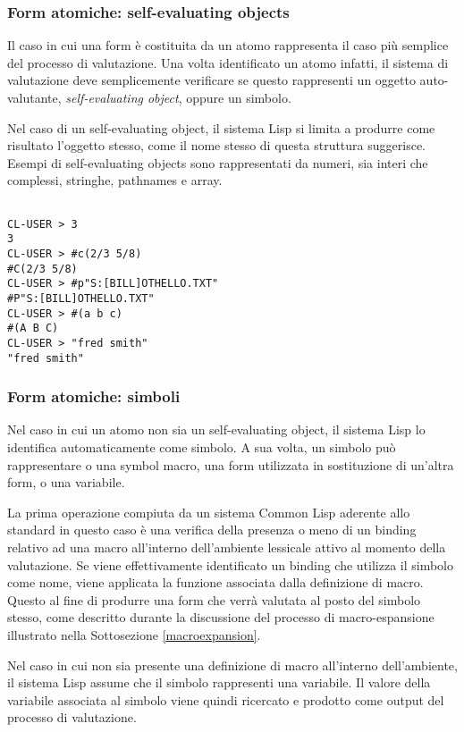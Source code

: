 \subsubsection{Form atomiche: self-evaluating objects}

Il caso in cui una form è costituita da un atomo rappresenta il caso più
semplice del processo di valutazione. Una volta identificato un atomo infatti,
il sistema di valutazione deve semplicemente verificare se questo rappresenti un
oggetto auto-valutante, \textit{self-evaluating object}, oppure un simbolo.

Nel caso di un self-evaluating object, il sistema Lisp si limita a produrre
come risultato l’oggetto stesso, come il nome stesso di questa struttura
suggerisce. Esempi di self-evaluating objects sono rappresentati da numeri,
sia interi che complessi, stringhe, pathnames e array.

\begin{lstlisting}[caption=Esempi di form di tipo self-evaluating object]

CL-USER > 3
3
CL-USER > #c(2/3 5/8)
#C(2/3 5/8)
CL-USER > #p"S:[BILL]OTHELLO.TXT"
#P"S:[BILL]OTHELLO.TXT"
CL-USER > #(a b c)
#(A B C)
CL-USER > "fred smith"
"fred smith"

\end{lstlisting}

\subsubsection{Form atomiche: simboli}

Nel caso in cui un atomo non sia un self-evaluating object, il sistema Lisp lo
identifica automaticamente come simbolo. A sua volta, un simbolo può
rappresentare o una symbol macro, una form utilizzata in sostituzione di
un’altra form, o una variabile.

La prima operazione compiuta da un sistema Common Lisp aderente allo standard in
questo caso è una verifica della presenza o meno di un binding relativo ad una
macro all’interno dell'ambiente lessicale attivo al momento della valutazione.
Se viene effettivamente identificato un binding che utilizza il simbolo come
nome, viene applicata la funzione associata dalla definizione di macro. Questo
al fine di produrre una form che verrà valutata al posto del simbolo stesso,
come descritto durante la discussione del processo di macro-espansione
illustrato nella Sottosezione \ref{macroexpansion}.

Nel caso in cui non sia presente una definizione di macro all’interno
dell’ambiente, il sistema Lisp assume che il simbolo rappresenti una variabile.
Il valore della variabile associata al simbolo viene quindi ricercato e prodotto
come output del processo di valutazione.\\

